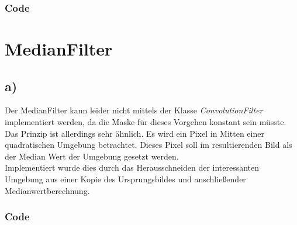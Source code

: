 \documentclass[12pt,german]{article}
\begin{document}
\subsubsection{Code}





\newpage
\section{MedianFilter}
\subsection{a)}Der MedianFilter kann leider nicht mittels der Klasse \textit{ConvolutionFilter} implementiert werden, da die Maske für dieses Vorgehen konstant sein müsste. Das Prinzip ist allerdings sehr ähnlich. Es wird ein Pixel in Mitten einer quadratischen Umgebung betrachtet. Dieses Pixel soll im resultierenden Bild als der Median Wert der Umgebung gesetzt werden. \\
Implementiert wurde dies durch das Herausschneiden der interessanten Umgebung aus einer Kopie des Ursprungsbildes und anschließender Medianwertberechnung. 
\subsubsection{Code}

\end{document}
